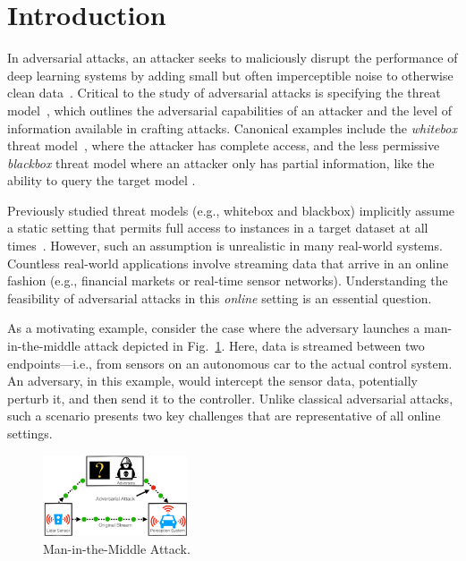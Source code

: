 \section{Introduction}


In adversarial attacks, an attacker seeks to maliciously disrupt the performance of deep learning systems by adding small but often imperceptible noise to otherwise clean data~\citep{szegedy2013intriguing,goodfellow2014explaining}. Critical to the study of adversarial attacks is specifying the threat model~\cite{akhtar2018threat}, which outlines the adversarial capabilities of an attacker and the level of information available in crafting attacks. Canonical examples include the \textit{whitebox} threat model~\cite{madry2017towards}, where the attacker has complete access, and the less permissive \textit{blackbox} threat model where an attacker only has partial information, like the ability to query the target model \citep{chen2017zoo,ilyas2017query,papernot2016transferability}. 

Previously studied threat models (e.g., whitebox and blackbox) implicitly assume a static setting that permits full access to instances in a target dataset at all times~\citep{tramer2017ensemble}. However, such an assumption is unrealistic in many real-world systems. Countless real-world applications involve streaming data that arrive in an online fashion (e.g., financial markets or real-time sensor networks). Understanding the feasibility of adversarial attacks in this {\em online} setting is an essential question. 

As a motivating example, consider the case where the adversary launches a man-in-the-middle attack depicted in Fig.~\ref{fig:man_in_the_middle}. Here, data is streamed between two endpoints---i.e., from sensors on an autonomous car to the actual control system. 
An adversary, in this example, would intercept the sensor data, potentially perturb it, and then send it to the controller. Unlike classical adversarial attacks, such a scenario presents two key challenges that are representative of all online settings. 

\begin{figure}
  \vspace{-12pt}
    \includegraphics[width=0.38\textwidth]{Figures/man_in_the_middle_attack_2.pdf}
  \vspace{-2pt}
\caption{Man-in-the-Middle Attack.}
\label{fig:man_in_the_middle}
\end{figure}

